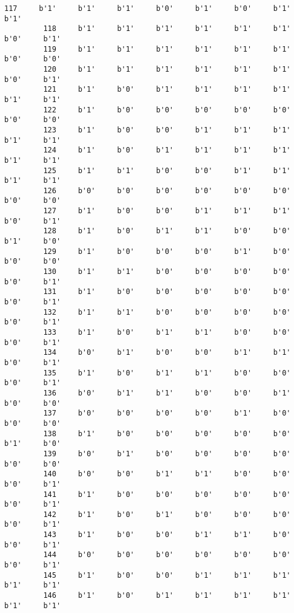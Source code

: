 \documentclass[11pt]{article}
\begin{document}
\begin{Verbatim}[commandchars=\\\{\}]
         117     b'1'     b'1'     b'1'     b'0'     b'1'     b'0'     b'1'     b'1'   
         118     b'1'     b'1'     b'1'     b'1'     b'1'     b'1'     b'0'     b'1'   
         119     b'1'     b'1'     b'1'     b'1'     b'1'     b'1'     b'0'     b'0'   
         120     b'1'     b'1'     b'1'     b'1'     b'1'     b'1'     b'0'     b'1'   
         121     b'1'     b'0'     b'1'     b'1'     b'1'     b'1'     b'1'     b'1'   
         122     b'1'     b'0'     b'0'     b'0'     b'0'     b'0'     b'0'     b'0'   
         123     b'1'     b'0'     b'0'     b'1'     b'1'     b'1'     b'1'     b'1'   
         124     b'1'     b'0'     b'1'     b'1'     b'1'     b'1'     b'1'     b'1'   
         125     b'1'     b'1'     b'0'     b'0'     b'1'     b'1'     b'1'     b'1'   
         126     b'0'     b'0'     b'0'     b'0'     b'0'     b'0'     b'0'     b'0'   
         127     b'1'     b'0'     b'0'     b'1'     b'1'     b'1'     b'0'     b'1'   
         128     b'1'     b'0'     b'1'     b'1'     b'0'     b'0'     b'1'     b'0'   
         129     b'1'     b'0'     b'0'     b'0'     b'1'     b'0'     b'0'     b'0'   
         130     b'1'     b'1'     b'0'     b'0'     b'0'     b'0'     b'0'     b'1'   
         131     b'1'     b'0'     b'0'     b'0'     b'0'     b'0'     b'0'     b'1'   
         132     b'1'     b'1'     b'0'     b'0'     b'0'     b'0'     b'0'     b'1'   
         133     b'1'     b'0'     b'1'     b'1'     b'0'     b'0'     b'0'     b'1'   
         134     b'0'     b'1'     b'0'     b'0'     b'1'     b'1'     b'0'     b'1'   
         135     b'1'     b'0'     b'1'     b'1'     b'0'     b'0'     b'0'     b'1'   
         136     b'0'     b'1'     b'1'     b'0'     b'0'     b'1'     b'0'     b'0'   
         137     b'0'     b'0'     b'0'     b'0'     b'1'     b'0'     b'0'     b'0'   
         138     b'1'     b'0'     b'0'     b'0'     b'0'     b'0'     b'1'     b'0'   
         139     b'0'     b'1'     b'0'     b'0'     b'0'     b'0'     b'0'     b'0'   
         140     b'0'     b'0'     b'1'     b'1'     b'0'     b'0'     b'0'     b'1'   
         141     b'1'     b'0'     b'0'     b'0'     b'0'     b'0'     b'0'     b'1'   
         142     b'1'     b'0'     b'1'     b'0'     b'0'     b'0'     b'0'     b'1'   
         143     b'1'     b'0'     b'0'     b'1'     b'1'     b'0'     b'0'     b'1'   
         144     b'0'     b'0'     b'0'     b'0'     b'0'     b'0'     b'0'     b'1'   
         145     b'1'     b'0'     b'0'     b'1'     b'1'     b'1'     b'1'     b'1'   
         146     b'1'     b'0'     b'1'     b'1'     b'1'     b'1'     b'1'     b'1'   

\end{Verbatim}
\end{document}

